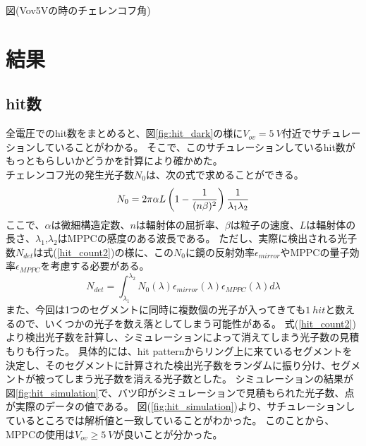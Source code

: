 \documentclass[uplatex, titlepage, dvipdfmx, 12pt, a4paper]{jsreport}
\begin{document}
      図(Vov5Vの時のチェレンコフ角)\\

\chapter{結果}
  \section{hit数}
    全電圧でのhit数をまとめると、図\ref{fig:hit_dark}の様に$V_{ov}=\SI{5}{V}$付近でサチュレーションしていることがわかる。
    そこで、このサチュレーションしているhit数がもっともらしいかどうかを計算により確かめた。\\
    チェレンコフ光の発生光子数$N_{0}$は、次の式で求めることができる。
    \begin{equation}
        N_{0} = 2 \pi \alpha L  \left(1 - \frac{1}{(n\beta)^2}\right) \frac{1}{\lambda_1\lambda_2} \\
        \label{hit_count1}
    \end{equation}
    ここで、$\alpha$は微細構造定数、$n$は輻射体の屈折率、$\beta$は粒子の速度、$L$は輻射体の長さ、$\lambda_{1}$,$\lambda_{2}$はMPPCの感度のある波長である。
    ただし、実際に検出される光子数$N_{det}$は式(\ref{hit_count2})の様に、この$N_{0}$に鏡の反射効率$\epsilon_{mirror}$やMPPCの量子効率$\epsilon_{MPPC}$を考慮する必要がある。
    \begin{equation}
        N_{det} = \int^{\lambda_2}_{\lambda_1} N_{0}\left(\lambda\right) \epsilon_{mirror}\left(\lambda\right) \epsilon_{MPPC}\left(\lambda\right) d\lambda
        \label{hit_count2}
    \end{equation}
    また、今回は1つのセグメントに同時に複数個の光子が入ってきても$\SI{1}{hit}$と数えるので、いくつかの光子を数え落としてしまう可能性がある。
    式(\ref{hit_count2})より検出光子数を計算し、シミュレーションによって消えてしまう光子数の見積もりも行った。
    具体的には、hit patternからリング上に来ているセグメントを決定し、そのセグメントに計算された検出光子数をランダムに振り分け、セグメントが被ってしまう光子数を消える光子数とした。
    シミュレーションの結果が図\ref{fig:hit_simulation}で、バツ印がシミュレーションで見積もられた光子数、点が実際のデータの値である。
    図(\ref{fig:hit_simulation})より、サチュレーションしているところでは解析値と一致していることがわかった。
    このことから、MPPCの使用は$V_{ov} \ge \SI{5}{V}$が良いことが分かった。
\end{document}
